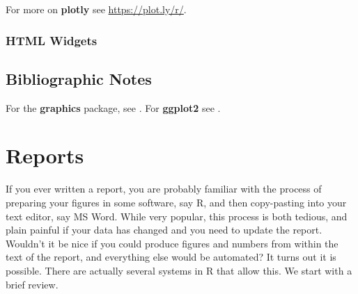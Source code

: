 \documentclass[]{book}
\theoremstyle{definition}
\theoremstyle{definition}
\theoremstyle{remark}
\begin{document}
For more on \textbf{plotly} see \url{https://plot.ly/r/}.

\subsection{HTML Widgets}\label{html-widgets}

\section{Bibliographic Notes}\label{bibliographic-notes-8}

For the \textbf{graphics} package, see \citet{Rlanguage}. For
\textbf{ggplot2} see \citet{ggplot2}.

\chapter{Reports}\label{report}

If you ever written a report, you are probably familiar with the process
of preparing your figures in some software, say R, and then copy-pasting
into your text editor, say MS Word. While very popular, this process is
both tedious, and plain painful if your data has changed and you need to
update the report. Wouldn't it be nice if you could produce figures and
numbers from within the text of the report, and everything else would be
automated? It turns out it is possible. There are actually several
systems in R that allow this. We start with a brief review.
\end{document}

